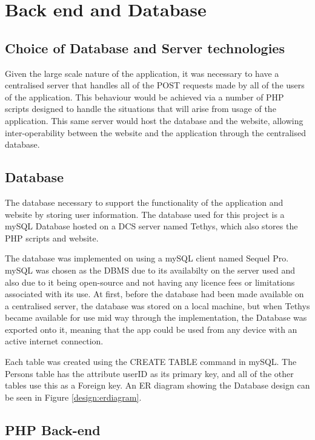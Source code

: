 \documentclass{l4proj}
\begin{document}
\section{Back end and Database}

\subsection{Choice of Database and Server technologies}

Given the large scale nature of the application, it was necessary to have a centralised server that handles all of the POST requests made by all of the users of the application. This behaviour would be achieved via a number of PHP scripts designed to handle the situations that will arise from usage of the application. This same server would host the database and the website, allowing inter-operability between the website and the application through the centralised database.

\subsection{Database}

The database necessary to support the functionality of the application and website by storing user information. The database used for this project is a mySQL Database hosted on a DCS server named Tethys, which also stores the PHP scripts and website.

The database was implemented on using a mySQL client named Sequel Pro. mySQL was chosen as the DBMS due to its availabilty on the server used and also due to it being open-source and not having any licence fees or limitations associated with its use. At first, before the database had been made available on a centralised server, the database was stored on a local machine, but when Tethys became available for use mid way through the implementation, the Database was exported onto it, meaning that the app could be used from any device with an active internet connection.

Each table was created using the CREATE TABLE command in mySQL. The Persons table has the attribute userID as its primary key, and all of the other tables use this as a Foreign key. An ER diagram showing the Database design can be seen in Figure \ref{design:erdiagram}.

\subsection{PHP Back-end}
\end{document}
